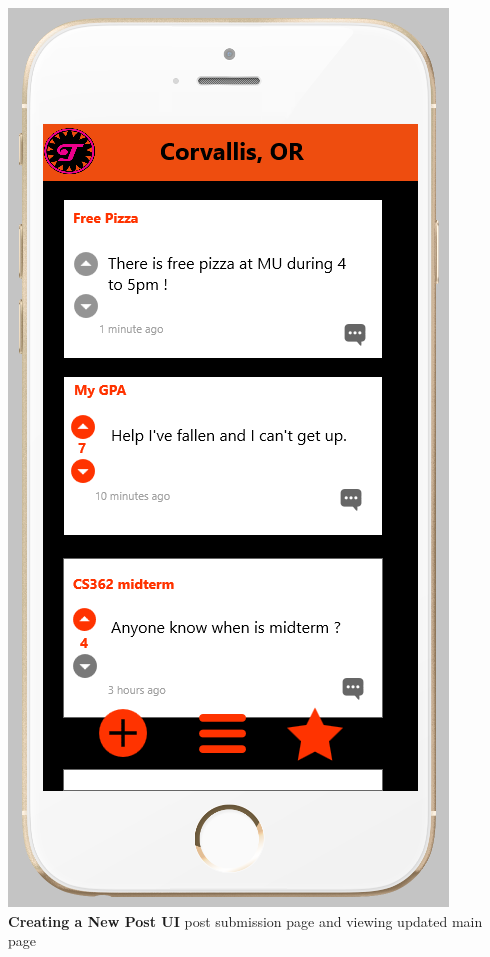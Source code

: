 \documentclass[12pt]{article}
\begin{document}
\begin{center}
\includegraphics[scale=0.30]{img/ui/post-review}\linebreak
\textbf{Creating a New Post UI}\linebreak
post submission page and viewing updated main page
  \end{center}
\end{document}
